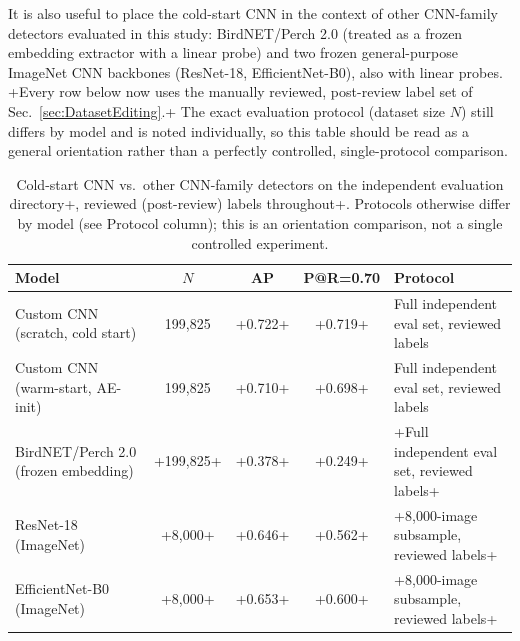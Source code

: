 \documentclass[preprint,NumberedRefs]{JASAnew}
\begin{document}
It is also useful to place the cold-start CNN in the context of other
CNN-family detectors evaluated in this study: BirdNET/Perch 2.0 (treated as a
frozen embedding extractor with a linear probe) and two frozen
general-purpose ImageNet CNN backbones (ResNet-18, EfficientNet-B0), also
with linear probes. {+}Every row below now uses the manually reviewed,
post-review label set of Sec.~\ref{sec:DatasetEditing}.{+} The exact
evaluation protocol (dataset size $N$) still differs by model and is noted
individually, so this table should be read as a general orientation rather
than a perfectly controlled, single-protocol comparison.

\begin{table}[ht]
    \centering
    \caption{Cold-start CNN vs.\ other CNN-family detectors on the
    independent evaluation directory{+}, reviewed (post-review) labels
    throughout{+}. Protocols otherwise differ by model (see Protocol
    column); this is an orientation comparison, not a single controlled
    experiment.}
    \label{tab:benchmark_results}
    \begin{tabular}{|l|c|c|c|l|}
        \hline
        Model & $N$ & AP & P@R=0.70 & Protocol \\
        \hline
        Custom CNN (scratch, cold start) & 199{,}825 & {+}0.722{+} & {+}0.719{+} & Full independent eval set, reviewed labels \\
        Custom CNN (warm-start, AE-init) & 199{,}825 & {+}0.710{+} & {+}0.698{+} & Full independent eval set, reviewed labels \\
        BirdNET/Perch 2.0 (frozen embedding) & {+}199{,}825{+} & {+}0.378{+} & {+}0.249{+} & {+}Full independent eval set, reviewed labels{+} \\
        ResNet-18 (ImageNet)             & {+}8{,}000{+}  & {+}0.646{+} & {+}0.562{+} & {+}8,000-image subsample, reviewed labels{+} \\
        EfficientNet-B0 (ImageNet)       & {+}8{,}000{+}  & {+}0.653{+} & {+}0.600{+} & {+}8,000-image subsample, reviewed labels{+} \\
        \hline
    \end{tabular}
\end{table}
\end{document}
